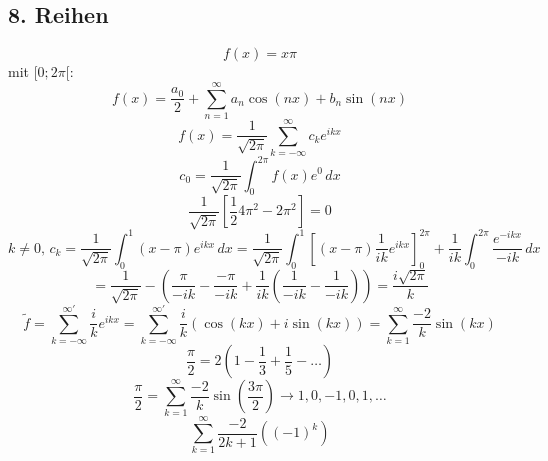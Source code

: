 \documentclass{article}
\begin{document}
    \subsection*{8. Reihen}
    \begin{equation*}
        f(x) = x\pi
    \end{equation*}
    mit $[0; 2\pi[$:
    \begin{equation*}
        f(x) = \frac{a_0}{2} + \sum_{n=1}^{\infty} a_n \cos(nx)+b_n\sin(nx)
    \end{equation*}
    \begin{equation*}
        f(x)=\frac{1}{\sqrt{2\pi}}\sum_{k = -\infty}^{\infty} c_k e^{ikx}
    \end{equation*}
    \begin{equation*}
        c_0 = \frac{1}{\sqrt{2\pi}} \int_{0}^{2\pi} f(x) e^0 \,dx
    \end{equation*}
    \begin{equation*}
        \frac{1}{\sqrt{2\pi}} \left[\frac{1}{2} 4\pi^2 - 2\pi^2\right] = 0
    \end{equation*}
    \begin{equation*}
        k \neq 0, \, c_k = \frac{1}{\sqrt{2\pi}} \int_{0}^{1} (x-\pi)e^{ikx} \, dx = \frac{1}{\sqrt{2\pi}} \int_{0}^{1} \left[(x-\pi)\frac{1}{ik}e^{ikx}\right]^{2\pi}_0 + \frac{1}{ik} \int_{0}^{2\pi} \frac{e^{-ikx}}{-ik} \, dx
    \end{equation*}
    \begin{equation*}
        = \frac{1}{\sqrt{2\pi}}-\left(\frac{\pi}{-ik} - \frac{-\pi}{-ik} + \frac{1}{ik}\left(\frac{1}{-ik}-\frac{1}{-ik}\right)\right) = \frac{i\sqrt{2\pi}}{k}
    \end{equation*}
    \begin{equation*}
        \tilde{f} = \sum_{k=-\infty}^{\infty'} \frac{i}{k} e^{ikx} = \sum_{k=-\infty}^{\infty'} \frac{i}{k} \left(\cos(kx)+i\sin(kx)\right) = \sum_{k=1}^{\infty} \frac{-2}{k}\sin(kx)
    \end{equation*}
    \begin{equation*}
        \frac{\pi}{2} = 2(1-\frac{1}{3}+\frac{1}{5}-\dots)
    \end{equation*}
    \begin{equation*}
        \frac{\pi}{2} = \sum_{k=1}^{\infty} \frac{-2}{k} \sin\left(\frac{3\pi}{2}\right) \rightarrow 1, 0, -1, 0, 1, \dots
    \end{equation*}
    \begin{equation*}
        \sum_{k=1}^{\infty} \frac{-2}{2k+1}\left((-1)^k\right)
    \end{equation*}
\end{document}
